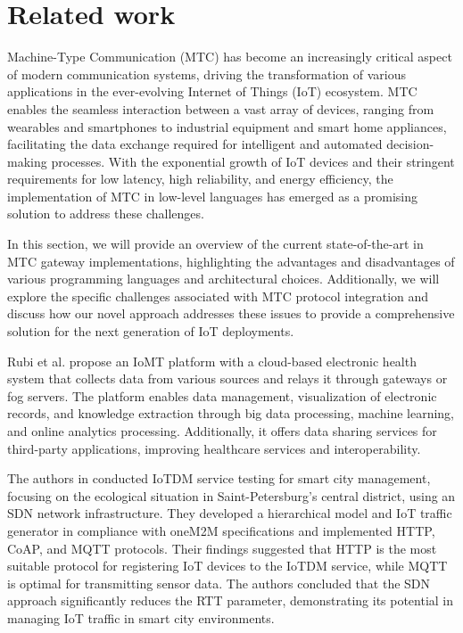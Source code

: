 \documentclass[a4paper,fleqn]{cas-dc}
\begin{document}
\section{Related work}

Machine-Type Communication (MTC) has become an increasingly critical aspect of modern communication systems, driving the transformation of various applications in the ever-evolving Internet of Things (IoT) ecosystem. MTC enables the seamless interaction between a vast array of devices, ranging from wearables and smartphones to industrial equipment and smart home appliances, facilitating the data exchange required for intelligent and automated decision-making processes. With the exponential growth of IoT devices and their stringent requirements for low latency, high reliability, and energy efficiency, the implementation of MTC in low-level languages has emerged as a promising solution to address these challenges.

In this section, we will provide an overview of the current state-of-the-art in MTC gateway implementations, highlighting the advantages and disadvantages of various programming languages and architectural choices. Additionally, we will explore the specific challenges associated with MTC protocol integration and discuss how our novel approach addresses these issues to provide a comprehensive solution for the next generation of IoT deployments.

Rubi et al. \cite{Rubi2019} propose an IoMT platform with a cloud-based electronic health system that collects data from various sources and relays it through gateways or fog servers. The platform enables data management, visualization of electronic records, and knowledge extraction through big data processing, machine learning, and online analytics processing. Additionally, it offers data sharing services for third-party applications, improving healthcare services and interoperability.

The authors in \cite{Volkov2017} conducted IoTDM service testing for smart city management, focusing on the ecological situation in Saint-Petersburg's central district, using an SDN network infrastructure. They developed a hierarchical model and IoT traffic generator in compliance with oneM2M specifications and implemented HTTP, CoAP, and MQTT protocols. Their findings suggested that HTTP is the most suitable protocol for registering IoT devices to the IoTDM service, while MQTT is optimal for transmitting sensor data. The authors concluded that the SDN approach significantly reduces the RTT parameter, demonstrating its potential in managing IoT traffic in smart city environments.
\end{document}
